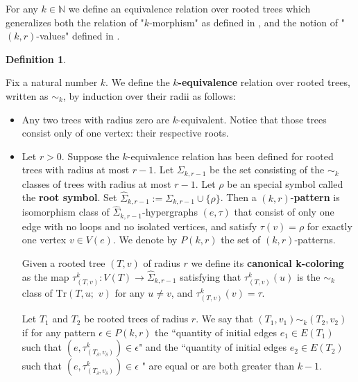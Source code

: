 \documentclass[12pt,notitlepage,a4paper]{article}
\theoremstyle{definition}
\newtheorem{definition}{Definition}[section]
\newcommand{\N}{\mathbb{N}}
\begin{document}
For any $k\in \N$ we define an equivalence relation over rooted trees
which generalizes both the relation of "$k$-morphism" as 
defined in \cite{lynch1992probabilities},
and the notion of "$(k,r)$-values" defined in \cite{salvadorbrasil}. 

\begin{definition}\label{def:sim_trees}
	 
	Fix a natural number $k$. We define the
	\textbf{$k$-equivalence} relation over rooted trees, 
	written as $\sim_k$, by induction over their radii as follows:
	
	\begin{itemize}[leftmargin=*]
		\item Any two trees with radius zero are $k$-equivalent.
		Notice that those trees
		consist only of one vertex: their respective roots.
		
		\item Let $r>0$.
		Suppose the $k$-equivalence relation has been
		defined for rooted trees with radius at most $r-1$. Let $\Sigma_{k,r-1}$
		be the set consisting of the $\sim_k$ classes of trees
		with radius at most $r-1$. Let $\rho$ be an special symbol called the
		\textbf{root symbol}. Set $\widehat{\Sigma}_{k,r-1}:=\Sigma_{k,r-1}\cup \{\rho\}$.
		Then a $(k,r)$-\textbf{pattern} is isomorphism class
		of $\widehat{\Sigma}_{k,r-1}$-hypergraphs 
		$(e,\tau)$ that consist of only one edge with no loops and no isolated vertices,
		and satisfy 
		$\tau(v)=\rho$ for exactly one vertex $v\in V(e)$. We
		denote by $P(k,r)$ the set of $(k,r)$-patterns. \par
		Given a rooted tree $(T,v)$ of radius $r$
		we define its \textbf{canonical k-coloring}
		as the map 
		$\tau^k_{(T,v)}: V(T)\rightarrow \widehat{\Sigma}_{k,r-1}$ satisfying that
		$\tau^k_{(T,v)}(u)$ is the
		$\sim_k$ class of $\mathrm{Tr}(T,u;\, \,v)$
		for any $u\neq v$, and $\tau^k_{(T,v)}(v)=\tau$. \par
		Let $T_1$ and $T_2$ be rooted trees of radius $r$. 
		We say that $(T_1,v_1)\sim_k (T_2,v_2)$ 
		if for any pattern $\epsilon\in P(k,r)$	the
		``quantity of initial edges $e_1\in E(T_1)$ such that
		$(e,\tau^k_{(T_\delta,v_\delta)}) \in \epsilon$" 
		and the
		``quantity of initial edges $e_2\in E(T_2)$ such that
		$(e,\tau^k_{(T_\delta,v_\delta)})\in \epsilon$
		" are equal or
		are both greater than $k-1$.
	\end{itemize}
	
\end{definition}
\end{document}
